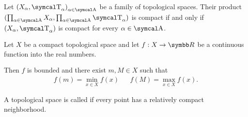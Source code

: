 \begin{theorem}\label{thm:tychonoffs_product_theorem}\cite[theorem 3.2.4]{Engelking1989}
  Let \( { (X_\al, \CT_\al) }_{\al \in \CA} \) be a family of topological spaces. Their product \( (\prod_{\al \in \CA} X_\al, \prod_{\al \in \CA} \CT_\al) \) is compact if and only if \( (X_\al, \CT_\al) \) is compact for every \( \al \in \CA \).

\end{theorem}

\begin{theorem}\label{thm:weierstrass_extreme_value_theorem}\cite[corollary 3.2.9]{Engelking1989}
  Let \( X \) be a compact topological space and let \( f: X \to \BR \) be a continuous function into the real numbers.

  Then \( f \) is bounded and there exist \( m, M \in X \) such that
  \begin{align*}
    f(m) = \min_{x \in X} f(x)
    &&
    f(M) = \max_{x \in X} f(x).
  \end{align*}
\end{theorem}

\begin{definition}\label{def:locally_compact_space}\cite[148]{Engelking1989}
  A topological space is called  if every point has a relatively compact neighborhood.
\end{definition}
